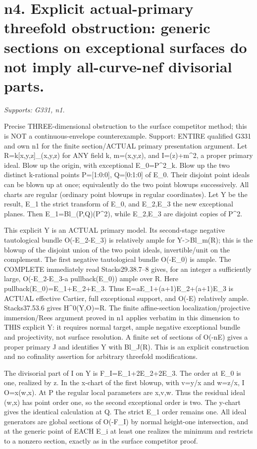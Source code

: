 \section{n4. Explicit actual-primary threefold obstruction: generic sections on exceptional surfaces do not imply all-curve-nef divisorial parts.}
\textit{Supports: G331, n1.}

Precise THREE-dimensional obstruction to the surface competitor method; this is NOT a continuous-envelope counterexample. Support: ENTIRE qualified G331 and own n1 for the finite section/ACTUAL primary presentation argument. Let R=k[x,y,z]\_(x,y,z) for ANY field k, m=(x,y,z), and I=(z)+m\textasciicircum{}2, a proper primary ideal. Blow up the origin, with exceptional E\_0=P\textasciicircum{}2\_k. Blow up the two distinct k-rational points P=[1:0:0], Q=[0:1:0] of E\_0. Their disjoint point ideals can be blown up at once; equivalently do the two point blowups successively. All charts are regular (ordinary point blowups in regular coordinates). Let Y be the result, E\_1 the strict transform of E\_0, and E\_2,E\_3 the new exceptional planes. Then E\_1=Bl\_(P,Q)(P\textasciicircum{}2), while E\_2,E\_3 are disjoint copies of P\textasciicircum{}2.

This explicit Y is an ACTUAL primary model. Its second-stage negative tautological bundle O(-E\_2-E\_3) is relatively ample for Y-\textgreater{}Bl\_m(R); this is the blowup of the disjoint union of the two point ideals, invertible/unit on the complement. The first negative tautological bundle O(-E\_0) is ample. The COMPLETE immediately read Stacks29.38.7--8 gives, for an integer a sufficiently large, O(-E\_2-E\_3-a pullback(E\_0)) ample over R. Here pullback(E\_0)=E\_1+E\_2+E\_3. Thus E=aE\_1+(a+1)E\_2+(a+1)E\_3 is ACTUAL effective Cartier, full exceptional support, and O(-E) relatively ample. Stacks37.53.6 gives H\textasciicircum{}0(Y,O)=R. The finite affine-section localization/projective immersion/Rees argument proved in n1 applies verbatim in this dimension to THIS explicit Y: it requires normal target, ample negative exceptional bundle and projectivity, not surface resolution. A finite set of sections of O(-nE) gives a proper primary J and identifies Y with Bl\_J(R). This is an explicit construction and no cofinality assertion for arbitrary threefold modifications.

The divisorial part of I on Y is F\_I=E\_1+2E\_2+2E\_3. The order at E\_0 is one, realized by z. In the x-chart of the first blowup, with v=y/x and w=z/x, I O=x(w,x). At P the regular local parameters are x,v,w. Thus the residual ideal (w,x) has point order one, so the second exceptional order is two. The y-chart gives the identical calculation at Q. The strict E\_1 order remains one. All ideal generators are global sections of O(-F\_I) by normal height-one intersection, and at the generic point of EACH E\_i at least one realizes the minimum and restricts to a nonzero section, exactly as in the surface competitor proof.

